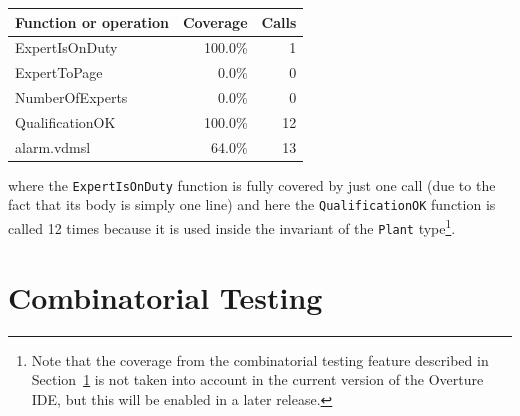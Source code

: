 \begin{longtable}{|l|r|r|}
\hline
Function or operation & Coverage & Calls \\
\hline
\hline
ExpertIsOnDuty & 100.0\% & 1 \\
\hline
ExpertToPage & 0.0\% & 0 \\
\hline
NumberOfExperts & 0.0\% & 0 \\
\hline
QualificationOK & 100.0\% & 12 \\
\hline
\hline
alarm.vdmsl & 64.0\% & 13 \\
\hline
\end{longtable}

\noindent where the \texttt{ExpertIsOnDuty} function is fully covered
by just one call (due to the fact that its body is simply one line)
and here the \texttt{QualificationOK} function is called 12 times
because it is used inside the invariant of the \texttt{Plant}
type\footnote{Note that the coverage from the combinatorial testing
  feature described in Section~\ref{sec:CT} is not taken into account
  in the current version of the Overture IDE, but this will be enabled
  in a later release.}.



\section{Combinatorial Testing}\label{sec:CT}


